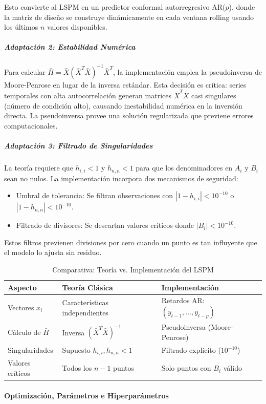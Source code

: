 Esto convierte al LSPM en un predictor conformal autorregresivo AR($p$), donde la matriz de diseño se construye dinámicamente en cada ventana rolling usando los últimos $n$ valores disponibles.

\subparagraph{Adaptación 2: Estabilidad Numérica}
Para calcular $\bar{H} = \bar{X}(\bar{X}^T\bar{X})^{-1}\bar{X}^T$, la implementación emplea la pseudoinversa de Moore-Penrose en lugar de la inversa estándar. Esta decisión es crítica: series temporales con alta autocorrelación generan matrices $\bar{X}^T\bar{X}$ casi singulares (número de condición alto), causando inestabilidad numérica en la inversión directa. La pseudoinversa provee una solución regularizada que previene errores computacionales.

\subparagraph{Adaptación 3: Filtrado de Singularidades}
La teoría requiere que $h_{i,i} < 1$ y $h_{n,n} < 1$ para que los denominadores en $A_i$ y $B_i$ sean no nulos. La implementación incorpora dos mecanismos de seguridad:
\begin{itemize}
    \item Umbral de tolerancia: Se filtran observaciones con $|1 - h_{i,i}| < 10^{-10}$ o $|1 - h_{n,n}| < 10^{-10}$.
    \item Filtrado de divisores: Se descartan valores críticos donde $|B_i| < 10^{-10}$.
\end{itemize}

Estos filtros previenen divisiones por cero cuando un punto es tan influyente que el modelo lo ajusta sin residuo.

\begin{table}[htbp]
\centering
\caption{Comparativa: Teoría vs. Implementación del LSPM}
\begin{tabular}{lll}
\toprule
\textbf{Aspecto} & \textbf{Teoría Clásica} & \textbf{Implementación} \\
\midrule
Vectores $x_i$ & Características independientes & Retardos AR: $(y_{t-1}, \dots, y_{t-p})$ \\
Cálculo de $\bar{H}$ & Inversa $(\bar{X}^T\bar{X})^{-1}$ & Pseudoinversa (Moore-Penrose) \\
Singularidades & Supuesto $h_{i,i}, h_{n,n} < 1$ & Filtrado explícito ($10^{-10}$) \\
Valores críticos & Todos los $n-1$ puntos & Solo puntos con $B_i$ válido\\
\bottomrule
\end{tabular}
\end{table}

\paragraph{Optimización, Parámetros e Hiperparámetros}

